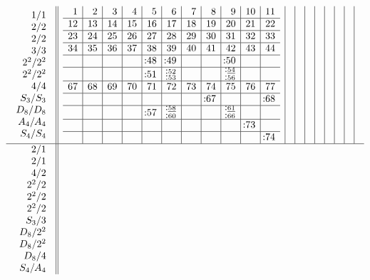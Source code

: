 \documentclass[12pt,a4paper]{amsart}
\begin{document}
\begin{align*}
  \begin{array}{r||c|c|c|c|c|c|c|c|c}
    \begin{array}{r}
      1/1 \\ 2/2 \\ 2/2 \\ 3/3 \\ 2^2/2^2 \\ 2^2/ 2^2 \\ 4/4 \\ S_3/S_3 \\ D_8/D_8 \\ A_4/A_4 \\ S_4/S_4 \\
    \end{array}
&
  \begin{array}{r|r|r|r|r|r|r|r|r|r|r}%
1&2&3&4&5&6&7&8&9&10&11\\%
\hline
12&13&14&15&16&17&18&19&20&21&22\\%
\hline
23&24&25&26&27&28&29&30&31&32&33\\%
\hline
34&35&36&37&38&39&40&41&42&43&44\\%
\hline
&&&&\llap:48&\llap:49&&&\llap:50&&\\%
\hline
&&&&\llap:51&^{\llap:52}_{\llap:53}&&&^{\llap:\underline{54}}_{\llap:56}&&\\%
\hline
67&68&69&70&71&72&73&74&75&76&77\\%
\hline
&&&&&&&\llap:67&&&\llap:68\\%
\hline
&&&&\llap:57&^{\llap:\underline{58}}_{\llap:60}&&&^{\llap:\underline{61}}_{\llap:66}&&\\%
\hline
&&&&&&&&&\llap:73&\\%
\hline
&&&&&&&&&&\llap:74\\%
\end{array}
&&&&&&&&\\
\hline
    \begin{array}{r}
      2/1 \\ 2/1 \\ 4/2 \\ 2^2/2 \\ 2^2/2 \\ 2^2/2 \\ S_3/3 \\ D_8/2^2 \\ D_8/2^2 \\ D_8/4 \\ S_4/A_4 \\
    \end{array}

\end{array}
\end{align*}
\end{document}
